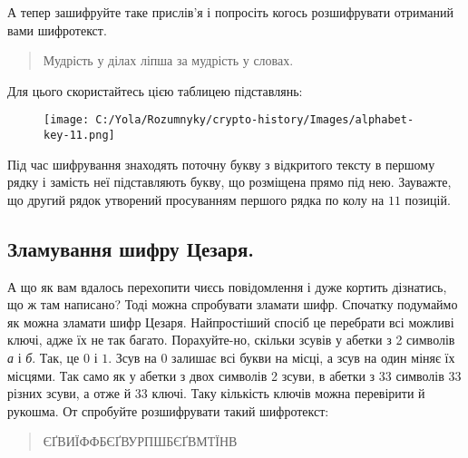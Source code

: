 \documentclass{book}
\begin{document}
\noindent
{
}

А тепер зашифруйте таке прислів'я і попросіть когось розшифрувати
отриманий вами шифротекст.

\begin{quote}
    Мудрість у ділах ліпша за мудрість у словах.
\end{quote}

Для цього скористайтесь цією таблицею підставлянь:

\begin{figure}[hbt!]
	\centering
	\texttt{[image: C:/Yola/Rozumnyky/crypto-history/Images/alphabet-key-11.png]}
\end{figure}

Під час шифрування знаходять поточну букву з відкритого тексту в першому рядку
і замість неї підставляють букву, що розміщена прямо під нею. Зауважте, що
другий рядок утворений просуванням першого рядка по колу на $11$ позицій.

\subsection*{Зламування шифру Цезаря.}

А що як вам вдалось перехопити чиєсь повідомлення і дуже кортить дізнатись,
що ж там написано? Тоді можна спробувати зламати шифр. Спочатку подумаймо як
можна зламати шифр Цезаря. Найпростіший спосіб це перебрати всі можливі ключі,
адже їх не так багато. Порахуйте-но, скільки зсувів у абетки з 2 символів
\emph{а} і \emph{б}. Так, це $0$ і $1$. Зсув на $0$ залишає всі букви на місці,
а зсув на один міняє їх місцями. Так само як у абетки з двох символів 2 зсуви,
в абетки з 33 символів 33 різних зсуви, а отже й 33 ключі. Таку кількість ключів
можна перевірити й рукошма. От спробуйте розшифрувати такий шифротекст:

\begin{quote}
	ЄҐВИЇФФБЄҐВУРПШБЄҐВМТЇНВ
\end{quote}
\end{document}
